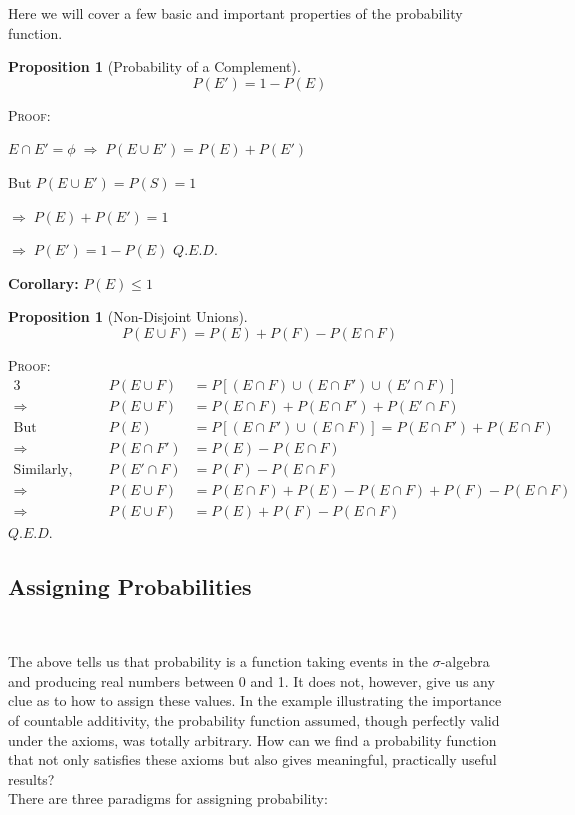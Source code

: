 \documentclass[12pt,a4paper]{article}
\newtheorem{prop}[thm]{Proposition}
\begin{document}
Here we will cover a few basic and important properties of the probability function.\par
\vspace{12pt}

\begin{prop}[Probability of a Complement]
$$P(E') = 1 - P(E)$$
\end{prop}

\noindent \textsc{Proof:}\par
\vspace{12pt}
\indent $E \cap E' = \phi \; \Rightarrow \; P(E \cup E') = P(E) + P(E')$\par
\indent But $P(E \cup E') = P(S) = 1$\par
\indent $\Rightarrow \; P(E) + P(E') = 1$\par
\indent $\Rightarrow \; P(E') = 1 - P(E)$ \hfill $Q.E.D.$\par

\vspace{12pt}
\noindent\textbf{Corollary:} $P(E) \leq 1$

\begin{prop}[Non-Disjoint Unions]
$$P(E \cup F) = P(E) + P(F) - P(E \cap F)$$
\end{prop}

\noindent\textsc{Proof:}
\begin{alignat*}{3}
& & P(E \cup F) &= P[(E \cap F) \cup (E \cap F') \cup (E' \cap F)]\\
\Rightarrow&\quad& P(E \cup F) &= P(E \cap F) + P(E \cap F') + P(E' \cap F)\\
\text{But }&\quad& P(E) &= P[(E \cap F') \cup (E \cap F)] = P(E \cap F') + P(E \cap F)\\
\Rightarrow&\quad& P(E \cap F') &= P(E) - P(E \cap F)\\
\text{Similarly,}&\quad& P(E' \cap F) &= P(F) - P(E \cap F)\\
\Rightarrow&\quad& P(E \cup F) &= P(E \cap F) + P(E) - P(E \cap F) + P(F) - P(E \cap F)\\
\Rightarrow&\quad& P(E \cup F) &= P(E) + P(F) - P(E \cap F)
\end{alignat*}\hfill $Q.E.D.$



\subsection{Assigning Probabilities}$\;$

The above tells us that probability is a function taking events in the $\sigma$-algebra and producing real numbers between 0 and 1. It does not, however, give us any clue as to how to assign these values. In the example illustrating the importance of countable additivity, the probability function assumed, though perfectly valid under the axioms, was totally arbitrary. How can we find a probability function that not only satisfies these axioms but also gives meaningful, practically useful results?\\
There are three paradigms for assigning probability:\par
\end{document}
